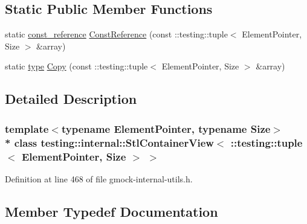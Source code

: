 \subsection*{Static Public Member Functions}
\begin{DoxyCompactItemize}
\item 
static \hyperlink{classtesting_1_1internal_1_1_stl_container_view_3_01_1_1testing_1_1tuple_3_01_element_pointer_00_01_size_01_4_01_4_a4c69a4e22173b0e6f3eb55636d6a38f1}{const\+\_\+reference} \hyperlink{classtesting_1_1internal_1_1_stl_container_view_3_01_1_1testing_1_1tuple_3_01_element_pointer_00_01_size_01_4_01_4_aba9be6fade312dd735ac47a3cb8cc355}{Const\+Reference} (const \+::testing\+::tuple$<$ Element\+Pointer, Size $>$ \&array)
\item 
static \hyperlink{classtesting_1_1internal_1_1_stl_container_view_3_01_1_1testing_1_1tuple_3_01_element_pointer_00_01_size_01_4_01_4_aedefb897170f76518afbca6f87b5467c}{type} \hyperlink{classtesting_1_1internal_1_1_stl_container_view_3_01_1_1testing_1_1tuple_3_01_element_pointer_00_01_size_01_4_01_4_a3d42db21a2f88d407a4b5acbb7fe252c}{Copy} (const \+::testing\+::tuple$<$ Element\+Pointer, Size $>$ \&array)
\end{DoxyCompactItemize}


\subsection{Detailed Description}
\subsubsection*{template$<$typename Element\+Pointer, typename Size$>$\\*
class testing\+::internal\+::\+Stl\+Container\+View$<$ \+::testing\+::tuple$<$ Element\+Pointer, Size $>$ $>$}



Definition at line 468 of file gmock-\/internal-\/utils.\+h.



\subsection{Member Typedef Documentation}
